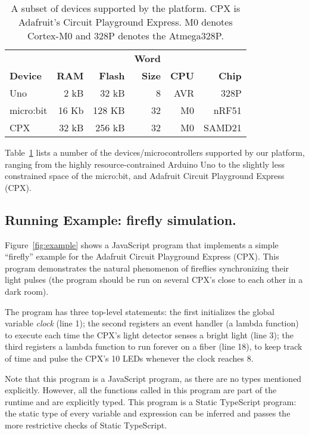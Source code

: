 \begin{table}[]
\centering
\begin{tabular}{|l|r|r|r|r|r|}
\hline
            &          &            & \bf{Word} &          &             \\
\bf{Device} & \bf{RAM} & \bf{Flash} & \bf{Size} & \bf{CPU} & \bf{Chip}   \\ \hline
Uno         & 2 kB     & 32 kB      & 8         & AVR      & 328P  \\ \hline
micro:bit   & 16 Kb    & 128 KB     & 32        & M0       & nRF51       \\ \hline
CPX         & 32 kB    & 256 kB     & 32        & M0       & SAMD21      \\ \hline
\end{tabular}
\caption{\label{table:devices}A subset of devices supported by the platform.
CPX is Adafruit's Circuit Playground Express. M0 denotes Cortex-M0 and 328P denotes
the Atmega328P.}
\end{table}

Table~\ref{table:devices} lists a number of the devices/microcontrollers supported by our platform, 
ranging from the highly resource-contrained Arduino Uno to the slightly less constrained space of
the micro:bit, and Adafruit Circuit Playground Express (CPX).

\subsection{Running Example: firefly simulation.}

Figure~\ref{fig:example} shows a JavaScript
program that implements a simple ``firefly'' example
for the Adafruit Circuit Playground Express (CPX).
This program demonstrates the natural phenomenon
of fireflies synchronizing their light pulses (the program should be
run on several CPX's close to each other in a dark room).

The program has three top-level statements:
the first initializes the global variable \emph{clock} (line 1); the
second registers an event handler (a lambda function) to execute
each time the CPX's light detector senses a bright light (line 3); the
third registers a lambda function to run forever on a fiber (line 18),
to keep track of time and pulse the CPX's 10 LEDs whenever the
clock reaches 8.  

Note that this program is a JavaScript program, as there are no
types mentioned explicitly. However, all the functions called in
this program are part of the runtime and are explicitly
typed. This program is a Static TypeScript program:
the static type of every variable and expression
can be inferred and passes the more restrictive checks
of Static TypeScript. 

